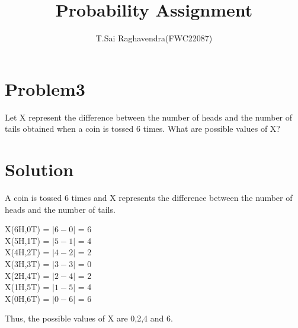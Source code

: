 \documentclass[journal,12pt,twocolumn]{IEEEtran}
\title{\mytitle}
\title{
Probability Assignment
}
\author{T.Sai Raghavendra(FWC22087)}
\begin{document}
\maketitle
\tableofcontents
\bigskip
\section{\textbf{Problem3}}
Let X represent the difference between the number of heads and the number of tails obtained when a coin is tossed 6 times. What are possible values of X?\\
\section{\textbf{Solution}}
A coin is tossed 6 times and X represents the difference between the number of heads and the number of tails.\\
\begin{center}
X(6H,0T) = $|6-0|$ = 6\\
X(5H,1T) = $|5-1|$ = 4\\
X(4H,2T) = $|4-2|$ = 2\\
X(3H,3T) = $|3-3|$ = 0\\
X(2H,4T) = $|2-4|$ = 2\\
X(1H,5T) = $|1-5|$ = 4\\
X(0H,6T) = $|0-6|$ = 6\\
\end{center}
Thus, the possible values of X are 0,2,4 and 6.
\end{document}
